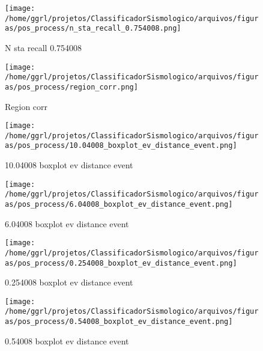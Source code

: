                     \begin{figure}[H]
                        \centering
                        \texttt{[image: /home/ggrl/projetos/ClassificadorSismologico/arquivos/figuras/pos\_process/n\_sta\_recall\_0.754008.png]}
                        \caption{N sta recall 0.754008}
                        \label{fig:n_sta_recall_0.754008}
                    \end{figure}
                

                    \begin{figure}[H]
                        \centering
                        \texttt{[image: /home/ggrl/projetos/ClassificadorSismologico/arquivos/figuras/pos\_process/region\_corr.png]}
                        \caption{Region corr}
                        \label{fig:region_corr}
                    \end{figure}
                

                    \begin{figure}[H]
                        \centering
                        \texttt{[image: /home/ggrl/projetos/ClassificadorSismologico/arquivos/figuras/pos\_process/10.04008\_boxplot\_ev\_distance\_event.png]}
                        \caption{10.04008 boxplot ev distance event}
                        \label{fig:10.04008_boxplot_ev_distance_event}
                    \end{figure}
                

                    \begin{figure}[H]
                        \centering
                        \texttt{[image: /home/ggrl/projetos/ClassificadorSismologico/arquivos/figuras/pos\_process/6.04008\_boxplot\_ev\_distance\_event.png]}
                        \caption{6.04008 boxplot ev distance event}
                        \label{fig:6.04008_boxplot_ev_distance_event}
                    \end{figure}
                

                    \begin{figure}[H]
                        \centering
                        \texttt{[image: /home/ggrl/projetos/ClassificadorSismologico/arquivos/figuras/pos\_process/0.254008\_boxplot\_ev\_distance\_event.png]}
                        \caption{0.254008 boxplot ev distance event}
                        \label{fig:0.254008_boxplot_ev_distance_event}
                    \end{figure}
                

                    \begin{figure}[H]
                        \centering
                        \texttt{[image: /home/ggrl/projetos/ClassificadorSismologico/arquivos/figuras/pos\_process/0.54008\_boxplot\_ev\_distance\_event.png]}
                        \caption{0.54008 boxplot ev distance event}
                        \label{fig:0.54008_boxplot_ev_distance_event}
                    \end{figure}
                